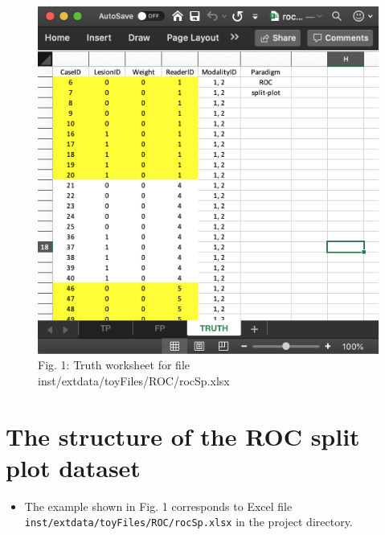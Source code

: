 \documentclass[
]{book}
\providecommand{\tightlist}{%
  \setlength{\itemsep}{0pt}\setlength{\parskip}{0pt}}
\begin{document}
\begin{figure}

{\centering \includegraphics[width=0.5\linewidth,height=0.2\textheight]{images/rocSpTruth} 

}

\caption{Fig. 1: Truth worksheet for file inst/extdata/toyFiles/ROC/rocSp.xlsx}\label{fig:unnamed-chunk-1}
\end{figure}

\hypertarget{the-structure-of-the-roc-split-plot-dataset}{%
\section{The structure of the ROC split plot dataset}\label{the-structure-of-the-roc-split-plot-dataset}}

\begin{itemize}
\tightlist
\item
  The example shown in Fig. 1 corresponds to Excel file \texttt{inst/extdata/toyFiles/ROC/rocSp.xlsx} in the project directory.
\end{itemize}
\end{document}
